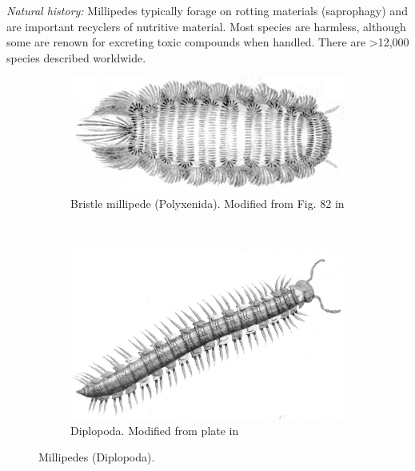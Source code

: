 \documentclass[letterpaper, 11pt]{article}
\begin{document}
\noindent{}\textit{Natural history:} Millipedes typically forage on rotting materials (saprophagy) and are important recyclers of nutritive material. Most species are harmless, although some are renown for excreting toxic compounds when handled. There are \textgreater12,000 species described worldwide.\\

\begin{figure}[ht!]
    \centering
    \begin{subfigure}[ht!]{0.25\textwidth}
        \includegraphics[width=\textwidth]{diplopod82.png}
        \caption{Bristle millipede (Polyxenida). Modified from Fig. 82 in \cite{bhlitem40112britmus}}
        \label{fig:diplop1}
    \end{subfigure}
    ~ %
    \begin{subfigure}[ht!]{0.65\textwidth}
        \includegraphics[width=\textwidth]{millip.png}
        \caption{Diplopoda. Modified from plate in \cite{bhlitem94979diplopo}}
        \label{fig:diplop2}
    \end{subfigure}
    \caption{Millipedes (Diplopoda).} \label{fig:diplopoda}
\end{figure}
\end{document}

